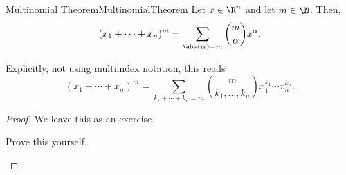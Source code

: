 \begin{thm}{Multinomial Theorem}{MultinomialTheorem}
Let $x\in \R ^n$ and let $m\in \N$.  Then,
\begin{equation}
(x_1+\cdots +x_n)^m=\sum _{\abs{\alpha}=m}\binom{m}{\alpha}x^{\alpha}.
\end{equation}
\begin{rmk}
Explicitly, not using multiindex notation, this reads
\begin{equation*}
(x_1+\cdots +x_n)^m=\sum _{k_1+\cdots +k_n=m}\binom{m}{k_1,\ldots ,k_n}x_1^{k_1}\cdots x_n^{k_n}.
\end{equation*}
\end{rmk}
\begin{proof}
We leave this as an exercise.
\begin{exr}[breakable=false]{}{}
Prove this yourself.
\end{exr}
\end{proof}
\end{thm}

